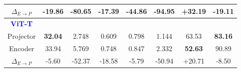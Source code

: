 \begin{table}[t]
{\begin{tabular}{c|c|cccc|c|c}
    \rowcolor{yellow!50}
    $\Delta_{E \rightarrow P}$ & -19.86 & -80.65 & -17.39 & -44.86 & -94.95 & +32.19 & -19.11 \\
    \toprule
    \rowcolor[gray]{0.9}
    \textcolor{blue}{\textbf{ViT-T}} \\
    Projector & \textbf{32.04} & 2.748 & 0.609 & 0.798 & 1.144 & 63.53 & \textbf{83.16} \\
    Encoder & 33.94 & 5.769 & 0.748 & 0.847 & 2.332 & \textbf{52.63} & 90.89 \\
    \rowcolor{yellow!50}
    $\Delta_{E \rightarrow P}$ & -5.60 & -52.37 & -18.58 & -5.79 & -50.94 & +20.71 & -8.50 \\
    \bottomrule
    \end{tabular}}
    \vspace{-0.1in}
\end{table}